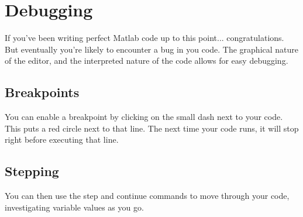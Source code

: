 
\section{Debugging}
If you've been writing perfect Matlab code up to this point... congratulations.
 But eventually you're likely to encounter a bug in you code.
 The graphical nature of the editor, and the interpreted nature of the code allows for easy debugging.

\subsection{Breakpoints}
You can enable a breakpoint by clicking on the small dash next to your code.
 This puts a red circle next to that line.
 The next time your code runs, it will stop right before executing that line.

\begin{quote}

\end{quote}

\pagebreak
\subsection{Stepping}
You can then use the step and continue commands to move through your code, investigating variable values as you go.

\begin{quote}
 
\end{quote}
